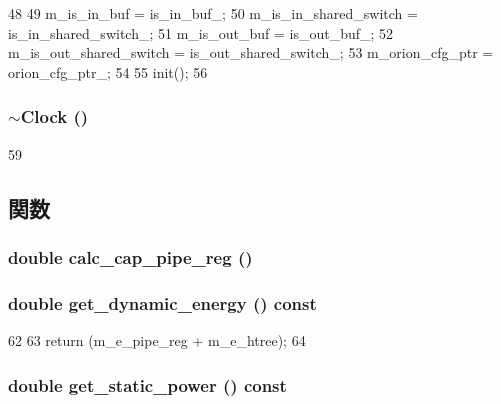 \begin{DoxyCode}
48 {
49     m_is_in_buf = is_in_buf_;
50     m_is_in_shared_switch = is_in_shared_switch_;
51     m_is_out_buf = is_out_buf_;
52     m_is_out_shared_switch = is_out_shared_switch_;
53     m_orion_cfg_ptr = orion_cfg_ptr_;
54 
55     init();
56 }
\end{DoxyCode}
\hypertarget{classClock_a4ae998d397f1e7cd192026fe38a071dd}{
\subsubsection[{$\sim$Clock}]{\setlength{\rightskip}{0pt plus 5cm}$\sim${\bf Clock} ()}}
\label{classClock_a4ae998d397f1e7cd192026fe38a071dd}



\begin{DoxyCode}
59 {}
\end{DoxyCode}


\subsection{関数}
\hypertarget{classClock_a1cea11df279df91aa67a782e8c0ccd1d}{
\subsubsection[{calc\_\-cap\_\-pipe\_\-reg}]{\setlength{\rightskip}{0pt plus 5cm}double calc\_\-cap\_\-pipe\_\-reg ()}}
\label{classClock_a1cea11df279df91aa67a782e8c0ccd1d}
\hypertarget{classClock_aaeb5ba44c1a68a29a876fa2f759c5280}{
\subsubsection[{get\_\-dynamic\_\-energy}]{\setlength{\rightskip}{0pt plus 5cm}double get\_\-dynamic\_\-energy () const}}
\label{classClock_aaeb5ba44c1a68a29a876fa2f759c5280}



\begin{DoxyCode}
62 {
63     return (m_e_pipe_reg + m_e_htree);
64 }
\end{DoxyCode}
\hypertarget{classClock_aeb5933543cfdeb1668baed5ce7c68351}{
\subsubsection[{get\_\-static\_\-power}]{\setlength{\rightskip}{0pt plus 5cm}double get\_\-static\_\-power () const}}
\label{classClock_aeb5933543cfdeb1668baed5ce7c68351}



